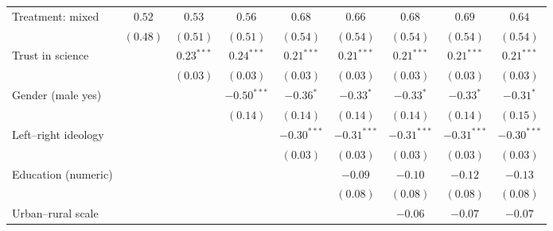 \begin{table}[h]
\begin{center}
\begin{tabular}{l c c c c c c c c}
Treatment: mixed                                                                & $0.52$      & $0.53$        & $0.56$        & $0.68$        & $0.66$        & $0.68$        & $0.69$        & $0.64$        \\
                                                                                & $(0.48)$    & $(0.51)$      & $(0.51)$      & $(0.54)$      & $(0.54)$      & $(0.54)$      & $(0.54)$      & $(0.54)$      \\
Trust in science                                                                &             & $0.23^{***}$  & $0.24^{***}$  & $0.21^{***}$  & $0.21^{***}$  & $0.21^{***}$  & $0.21^{***}$  & $0.21^{***}$  \\
                                                                                &             & $(0.03)$      & $(0.03)$      & $(0.03)$      & $(0.03)$      & $(0.03)$      & $(0.03)$      & $(0.03)$      \\
Gender (male yes)                                                               &             &               & $-0.50^{***}$ & $-0.36^{*}$   & $-0.33^{*}$   & $-0.33^{*}$   & $-0.33^{*}$   & $-0.31^{*}$   \\
                                                                                &             &               & $(0.14)$      & $(0.14)$      & $(0.14)$      & $(0.14)$      & $(0.14)$      & $(0.15)$      \\
Left–right ideology                                                             &             &               &               & $-0.30^{***}$ & $-0.31^{***}$ & $-0.31^{***}$ & $-0.31^{***}$ & $-0.30^{***}$ \\
                                                                                &             &               &               & $(0.03)$      & $(0.03)$      & $(0.03)$      & $(0.03)$      & $(0.03)$      \\
Education (numeric)                                                             &             &               &               &               & $-0.09$       & $-0.10$       & $-0.12$       & $-0.13$       \\
                                                                                &             &               &               &               & $(0.08)$      & $(0.08)$      & $(0.08)$      & $(0.08)$      \\
Urban–rural scale                                                               &             &               &               &               &               & $-0.06$       & $-0.07$       & $-0.07$       \\

\end{tabular}
\end{center}
\end{table}
